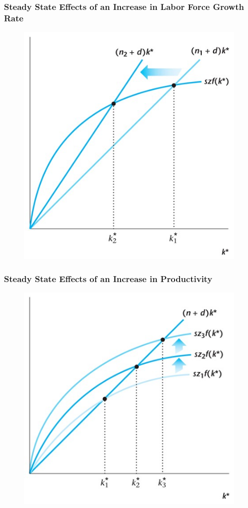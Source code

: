 \documentclass{beamer}
\begin{document}
\begin{frame}
\frametitle[alignment=center]{Steady State Effects of an Increase in Labor Force Growth Rate}
\begin{figure}
\centering
\includegraphics[scale=0.5]{Figures/W_Fig_7pt19.png}
\end{figure}
\end{frame}

\begin{frame}
\frametitle[alignment=center]{Steady State Effects of an Increase in Productivity}
\begin{figure}
\centering
\includegraphics[scale=0.5]{Figures/W_Fig_7pt20.png}
\end{figure}
\end{frame}
\end{document}

